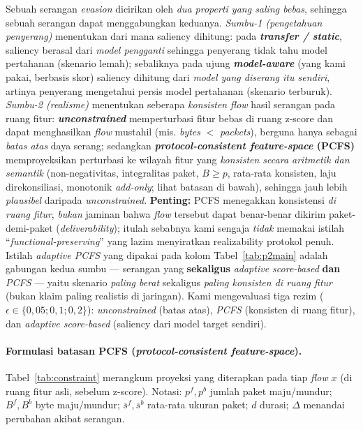 \documentclass[11pt,a4paper]{article}
\begin{document}
Sebuah serangan \emph{evasion} dicirikan oleh \emph{dua properti yang saling bebas},
sehingga sebuah serangan dapat menggabungkan keduanya. \emph{Sumbu-1 (pengetahuan
penyerang)} menentukan dari mana saliency dihitung: pada \textbf{\emph{transfer /
static}}, saliency berasal dari \emph{model pengganti} sehingga penyerang tidak tahu
model pertahanan (skenario lemah); sebaliknya pada ujung \textbf{\emph{model-aware}} (yang kami pakai, berbasis skor) saliency dihitung dari \emph{model yang diserang itu sendiri}, artinya penyerang
mengetahui persis model pertahanan (skenario terburuk). \emph{Sumbu-2 (realisme)}
menentukan seberapa \emph{konsisten} \emph{flow} hasil serangan pada ruang fitur:
\textbf{\emph{unconstrained}} memperturbasi fitur bebas di ruang z-score dan dapat
menghasilkan \emph{flow} mustahil (mis. \emph{bytes} $<$ \emph{packets}), berguna
hanya sebagai \emph{batas atas} daya serang; sedangkan \textbf{\emph{protocol-consistent
feature-space} (PCFS)} memproyeksikan perturbasi ke wilayah fitur yang \emph{konsisten
secara aritmetik dan semantik} (non-negativitas, integralitas paket, $B\ge p$,
rata-rata konsisten, laju direkonsiliasi, monotonik \emph{add-only}; lihat batasan
di bawah), sehingga jauh lebih \emph{plausibel} daripada \emph{unconstrained}.
\textbf{Penting:} PCFS menegakkan konsistensi \emph{di ruang fitur}, \emph{bukan}
jaminan bahwa \emph{flow} tersebut dapat benar-benar dikirim paket-demi-paket
(\emph{deliverability}); itulah sebabnya kami sengaja \emph{tidak} memakai istilah
``\emph{functional-preserving}'' yang lazim menyiratkan realizability protokol penuh.
Istilah \emph{adaptive PCFS} yang dipakai pada kolom Tabel~\ref{tab:p2main} adalah
gabungan kedua sumbu --- serangan yang \textbf{sekaligus} \emph{adaptive score-based}
\textbf{dan} \emph{PCFS} --- yaitu skenario \emph{paling berat} sekaligus \emph{paling
konsisten di ruang fitur} (bukan klaim paling realistis di jaringan). Kami
mengevaluasi tiga rezim ($\epsilon \in \{0{,}05; 0{,}1; 0{,}2\}$): \emph{unconstrained}
(batas atas), \emph{PCFS} (konsisten di ruang fitur), dan \emph{adaptive score-based}
(saliency dari model target sendiri).

\paragraph{Formulasi batasan PCFS (\emph{protocol-consistent feature-space}).}
Tabel~\ref{tab:constraint} merangkum proyeksi yang diterapkan pada tiap \emph{flow}
$x$ (di ruang fitur asli,
sebelum z-score). Notasi: $p^{f},p^{b}$ jumlah paket maju/mundur; $B^{f},B^{b}$ byte
maju/mundur; $\bar{s}^{f},\bar{s}^{b}$ rata-rata ukuran paket; $d$ durasi; $\Delta$
menandai perubahan akibat serangan.
\end{document}
